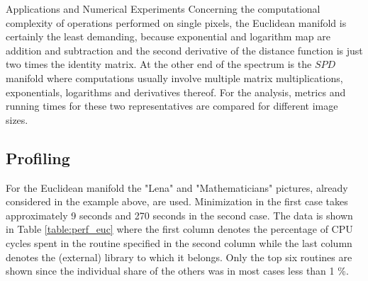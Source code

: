 \begin{chapter}{Applications and Numerical Experiments}
Concerning the computational complexity of operations performed on single pixels, the Euclidean manifold is certainly the least demanding, because exponential and logarithm map are 
addition and subtraction and the second derivative of the distance function is just two times the identity matrix. At the other end of the spectrum is the $SPD$ manifold where
computations usually involve multiple matrix multiplications, exponentials, logarithms and derivatives thereof. For the analysis, metrics 
and running times for these two representatives are compared for different image sizes.\\

\subsection{Profiling}
For the Euclidean manifold the "Lena" and "Mathematicians" pictures, already considered in the example above, are used. Minimization in the first case takes approximately 9 seconds and 270 seconds in
the second case. The data is shown in Table \ref{table:perf_euc} where the first column denotes the percentage of CPU cycles spent in the routine specified in the second column 
while the last column denotes the (external) library to which it belongs. Only the top six routines are shown since the individual share of the others was in most cases less than 1 \%. \\


\end{chapter}
